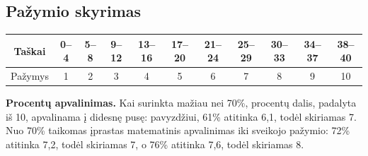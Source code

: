 \documentclass[11pt,a4paper]{article}
\begin{document}
\subsection*{Pažymio skyrimas}
\begin{center}\small
\begin{tabular}{|c|*{10}{c|}}\hline
Taškai&0--4&5--8&9--12&13--16&17--20&21--24&25--29&30--33&34--37&38--40\\\hline
Pažymys&1&2&3&4&5&6&7&8&9&10\\\hline
\end{tabular}\end{center}

\textbf{Procentų apvalinimas.} Kai surinkta mažiau nei 70\%, procentų dalis, padalyta iš 10, apvalinama į didesnę pusę: pavyzdžiui, 61\% atitinka 6,1, todėl skiriamas 7. Nuo 70\% taikomas įprastas matematinis apvalinimas iki sveikojo pažymio: 72\% atitinka 7,2, todėl skiriamas 7, o 76\% atitinka 7,6, todėl skiriamas 8.

\newpage
\end{document}
